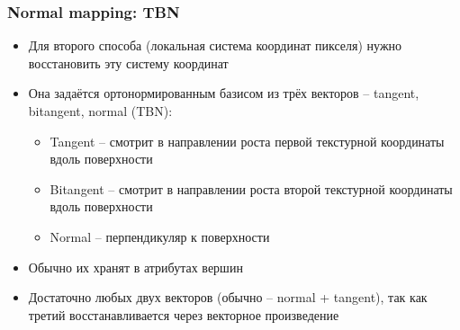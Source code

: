 \documentclass{beamer}
\begin{document}
\begin{frame}[fragile]
\frametitle{Normal mapping: TBN}
\begin{itemize}
\item Для второго способа (локальная система координат пикселя) нужно восстановить эту систему координат
\pause
\item Она задаётся ортонормированным базисом из трёх векторов -- tangent, bitangent, normal (TBN):
\pause
\begin{itemize}
\item Tangent -- смотрит в направлении роста первой текстурной координаты вдоль поверхности
\item Bitangent -- смотрит в направлении роста второй текстурной координаты вдоль поверхности
\item Normal -- перпендикуляр к поверхности
\end{itemize}
\pause
\item Обычно их хранят в атрибутах вершин
\item Достаточно любых двух векторов (обычно -- normal + tangent), так как третий восстанавливается через векторное произведение
\end{itemize}
\end{frame}
\end{document}
